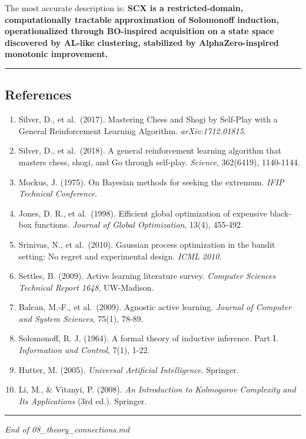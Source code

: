 \documentclass[
  12pt,
]{ctexart}
\providecommand{\tightlist}{%
  \setlength{\itemsep}{0pt}\setlength{\parskip}{0pt}}
\begin{document}
The most accurate description is: \textbf{SCX is a restricted-domain,
computationally tractable approximation of Solomonoff induction,
operationalized through BO-inspired acquisition on a state space
discovered by AL-like clustering, stabilized by AlphaZero-inspired
monotonic improvement.}

\begin{center}\rule{0.5\linewidth}{0.5pt}\end{center}

\subsection{References}\label{references}

\begin{enumerate}
\def\labelenumi{\arabic{enumi}.}
\tightlist
\item
  Silver, D., et al.~(2017). Mastering Chess and Shogi by Self-Play with
  a General Reinforcement Learning Algorithm. \emph{arXiv:1712.01815}.
\item
  Silver, D., et al.~(2018). A general reinforcement learning algorithm
  that masters chess, shogi, and Go through self-play. \emph{Science},
  362(6419), 1140-1144.
\item
  Mockus, J. (1975). On Bayesian methods for seeking the extremum.
  \emph{IFIP Technical Conference}.
\item
  Jones, D. R., et al.~(1998). Efficient global optimization of
  expensive black-box functions. \emph{Journal of Global Optimization},
  13(4), 455-492.
\item
  Srinivas, N., et al.~(2010). Gaussian process optimization in the
  bandit setting: No regret and experimental design. \emph{ICML 2010}.
\item
  Settles, B. (2009). Active learning literature survey. \emph{Computer
  Sciences Technical Report 1648}, UW-Madison.
\item
  Balcan, M.-F., et al.~(2009). Agnostic active learning. \emph{Journal
  of Computer and System Sciences}, 75(1), 78-89.
\item
  Solomonoff, R. J. (1964). A formal theory of inductive inference. Part
  I. \emph{Information and Control}, 7(1), 1-22.
\item
  Hutter, M. (2005). \emph{Universal Artificial Intelligence}. Springer.
\item
  Li, M., \& Vitanyi, P. (2008). \emph{An Introduction to Kolmogorov
  Complexity and Its Applications} (3rd ed.). Springer.
\end{enumerate}

\begin{center}\rule{0.5\linewidth}{0.5pt}\end{center}

\emph{End of 08\_theory\_connections.md}
\end{document}
